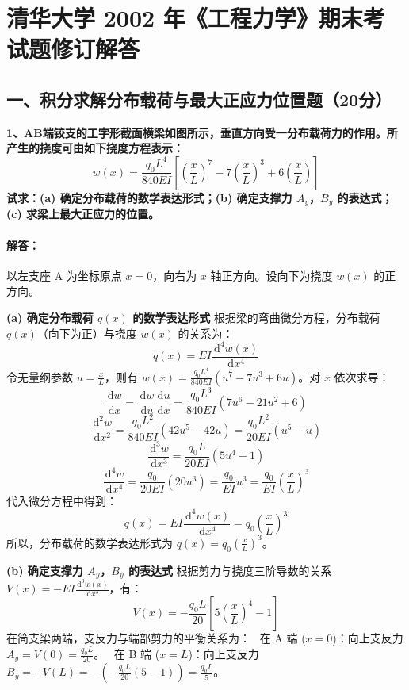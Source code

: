 \documentclass[11pt,a4paper]{ctexrep}
\newcommand{\diff}{\,\mathrm{d}}
\begin{document}
\chapter{清华大学 2002 年《工程力学》期末考试题修订解答}
{


\vspace{-1.0cm}

\section*{一、积分求解分布载荷与最大正应力位置题（20分）}

\textbf{1、AB端铰支的工字形截面横梁如图所示，垂直方向受一分布载荷力的作用。所产生的挠度可由如下挠度方程表示：}
\[
    w(x) = \frac{q_0 L^4}{840 EI} \left[ \left(\frac{x}{L}\right)^7 - 7\left(\frac{x}{L}\right)^3 + 6\left(\frac{x}{L}\right) \right]
\]
\textbf{试求：(a) 确定分布载荷的数学表达形式；(b) 确定支撑力 $A_y$，$B_y$ 的表达式；(c) 求梁上最大正应力的位置。}

\subsubsection*{解答：}

以左支座 A 为坐标原点 $x = 0$，向右为 $x$ 轴正方向。设向下为挠度 $w(x)$ 的正方向。

\textbf{(a) 确定分布载荷 $q(x)$ 的数学表达形式}
根据梁的弯曲微分方程，分布载荷 $q(x)$（向下为正）与挠度 $w(x)$ 的关系为：
\[
    q(x) = EI \frac{\diff^4 w(x)}{\diff x^4}
\]
令无量纲参数 $u = \frac{x}{L}$，则有 $w(x) = \frac{q_0 L^4}{840 EI} (u^7 - 7u^3 + 6u)$。对 $x$ 依次求导：
\[
    \frac{\diff w}{\diff x} = \frac{\diff w}{\diff u} \frac{\diff u}{\diff x} = \frac{q_0 L^3}{840 EI} (7u^6 - 21u^2 + 6)
\]
\[
    \frac{\diff^2 w}{\diff x^2} = \frac{q_0 L^2}{840 EI} (42u^5 - 42u) = \frac{q_0 L^2}{20 EI} (u^5 - u)
\]
\[
    \frac{\diff^3 w}{\diff x^3} = \frac{q_0 L}{20 EI} (5u^4 - 1)
\]
\[
    \frac{\diff^4 w}{\diff x^4} = \frac{q_0}{20 EI} (20u^3) = \frac{q_0}{EI} u^3 = \frac{q_0}{EI} \left(\frac{x}{L}\right)^3
\]
代入微分方程中得到：
\[
    q(x) = EI \frac{\diff^4 w(x)}{\diff x^4} = q_0 \left(\frac{x}{L}\right)^3
\]
所以，分布载荷的数学表达形式为 $q(x) = q_0 \left(\frac{x}{L}\right)^3$。

\textbf{(b) 确定支撑力 $A_y$，$B_y$ 的表达式}
根据剪力与挠度三阶导数的关系 $V(x) = -EI \frac{\diff^3 w(x)}{\diff x^3}$，有：
\[
    V(x) = -\frac{q_0 L}{20} \left[ 5\left(\frac{x}{L}\right)^4 - 1 \right]
\]
在简支梁两端，支反力与端部剪力的平衡关系为：
\noindent\textbullet\ 在 A 端 ($x = 0$)：向上支反力 $A_y = V(0) = \frac{q_0 L}{20}$。
\noindent\textbullet\ 在 B 端 ($x = L$)：向上支反力 $B_y = -V(L) = -\left( -\frac{q_0 L}{20} (5 - 1) \right) = \frac{q_0 L}{5}$。

}
\end{document}

